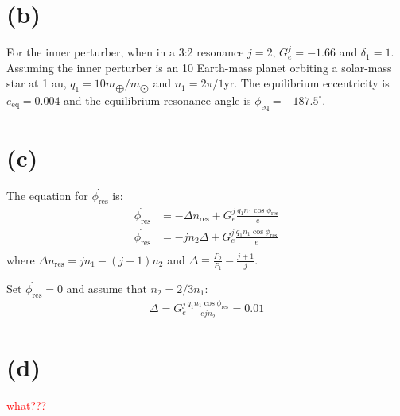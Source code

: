\documentclass[a4paper,12pt]{article}
\begin{document}
\section*{(b)}
For the inner perturber, when in a 3:2 resonance $j=2$, $G_e^j = -1.66$ and $\delta_1 = 1$.
Assuming the inner perturber is an 10 Earth-mass planet orbiting a solar-mass star at 1 au, 
$q_1 = 10m_{\bigoplus}/m_{\bigodot}$ and $n_1 = 2\pi/1 $yr.
The equilibrium eccentricity is $e_{\text{eq}} = 0.004$ and the equilibrium resonance angle is 
$\phi_{\text{eq}} = -187.5 ^{\circ}$.

\section*{(c)}
The equation for $\dot{\phi_{\text{res}}}$ is:
\begin{align*}
    \dot{\phi_{\text{res}}} &= - \Delta n_{\text{res}} + G_e^j \frac{q_1 n_1 \cos \phi_{\text{res}}}{e} \\
    \dot{\phi_{\text{res}}} &= - jn_2 \Delta + G_e^j \frac{q_1 n_1 \cos \phi_{\text{res}}}{e} \\
\end{align*}
where $\Delta n_{\text{res}} = jn_1 - (j+1) n_2$ and $\Delta \equiv \frac{P_2}{P_1} - \frac{j+1}{j}$.

Set $\dot{\phi_{\text{res}}}=0$ and assume that $n_2 = 2/3 n_1$:
\begin{align*}
    \Delta = G_e^j \frac{q_1 n_1 \cos \phi_{\text{res}}}{ejn_2} = 0.01
\end{align*}

\section*{(d)}
\textcolor{red}{what???}
\end{document}

